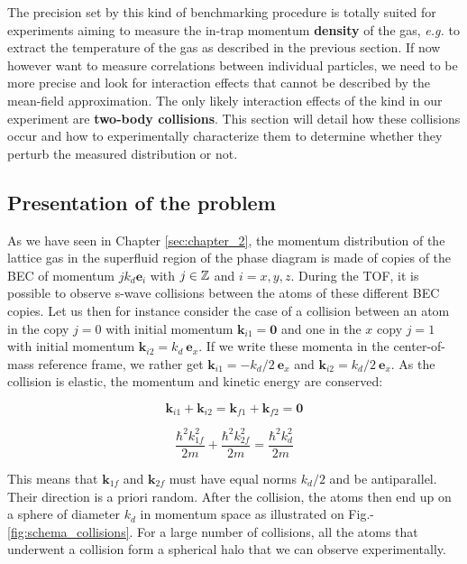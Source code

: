 The precision set by this kind of benchmarking procedure is totally suited for experiments aiming to measure the in-trap momentum \textbf{density} of the gas, {\it e.g.} to extract the temperature of the gas as described in the previous section. If now however want to measure correlations between individual particles, we need to be more precise and look for interaction effects that cannot be described by the mean-field approximation. The only likely interaction effects of the kind in our experiment are \textbf{two-body collisions}. This section will detail how these collisions occur and how to experimentally characterize them to determine whether they perturb the measured distribution or not.

\subsection{Presentation of the problem}

As we have seen in Chapter \ref{sec:chapter_2}, the momentum distribution of the lattice gas in the superfluid region of the phase diagram is made of copies of the BEC of momentum $j k_d \bm{e}_i$ with $j \in \mathbb{Z}$ and $i=x,y,z$. During the TOF, it is possible to observe s-wave collisions between the atoms of these different BEC copies. Let us then for instance consider the case of a collision between an atom in the copy $j=0$ with initial momentum $\bm{k}_{i1}=\bm{0}$ and one in the $x$ copy $j=1$ with initial momentum $\bm{k}_{i2}=k_d \ \bm{e}_x$. If we write these momenta in the center-of-mass reference frame, we rather get $\bm{k}_{i1}=-k_d/2 \ \bm{e}_x$ and $ \bm{k}_{i2}=k_d/2 \ \bm{e}_x$. As the collision is elastic, the momentum and kinetic energy are conserved:

\begin{equation}
    \bm{k}_{i1}+\bm{k}_{i2}=\bm{k}_{f1}+\bm{k}_{f2}=\bm{0}
\end{equation}

\begin{equation}
    \frac{\hbar^2 k^2_{1f}}{2m} + \frac{\hbar^2 k^2_{2f}}{2m} =  \frac{\hbar^2 k_d^2}{2m}
\end{equation}

\noindent This means that $\bm{k}_{1f}$ and $\bm{k}_{2f}$ must have equal norms $k_d/2$ and be antiparallel. Their direction is a priori random. After the collision, the atoms then end up on a sphere of diameter $k_d$ in momentum space as illustrated on Fig.-\ref{fig:schema_collisions}. For a large number of collisions, all the atoms that underwent a collision form a spherical halo that we can observe experimentally.

